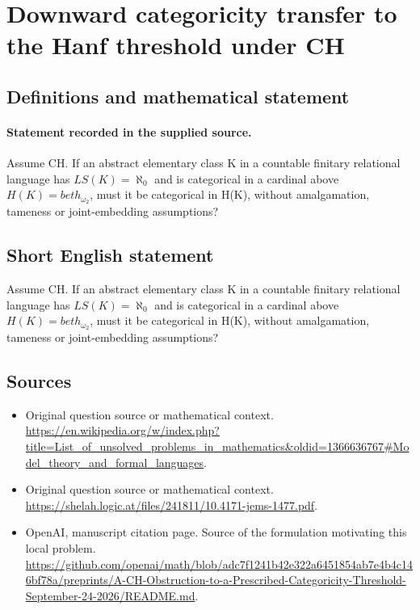\documentclass[11pt]{article}
\begin{document}
\section*{Downward categoricity transfer to the Hanf threshold under CH}\label{30007202}
\subsection{Definitions and mathematical statement}
\paragraph{Statement recorded in the supplied source.}
Assume CH. If an abstract elementary class K in a countable finitary relational language has $LS(K)=\aleph _{0}$ and is categorical in a cardinal above $H(K)=beth_{\omega _{2}}$, must it be categorical in H(K), without amalgamation, tameness or joint-embedding assumptions?
\subsection{Short English statement}
Assume CH. If an abstract elementary class K in a countable finitary relational language has $LS(K)=\aleph _{0}$ and is categorical in a cardinal above $H(K)=beth_{\omega _{2}}$, must it be categorical in H(K), without amalgamation, tameness or joint-embedding assumptions?
\subsection{Sources}
\begin{itemize}
\item[S1] Original question source or mathematical context.
\url{https://en.wikipedia.org/w/index.php?title=List_of_unsolved_problems_in_mathematics&oldid=1366636767#Model_theory_and_formal_languages}.
\item[S2] Original question source or mathematical context.
\url{https://shelah.logic.at/files/241811/10.4171-jems-1477.pdf}.
\item[S3] OpenAI, manuscript citation page. Source of the formulation motivating this local problem.
\url{https://github.com/openai/math/blob/adc7f1241b42e322a6451854ab7e4b4c146bf78a/preprints/A-CH-Obstruction-to-a-Prescribed-Categoricity-Threshold-September-24-2026/README.md}.
\end{itemize}
\end{document}
